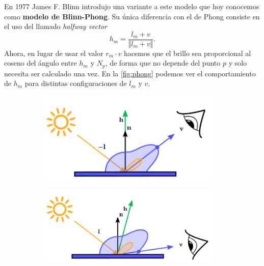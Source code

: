 En 1977 James F. Blinn \cite{blinn1977models} introdujo una variante a este modelo que hoy conocemos como \textbf{modelo de Blinn-Phong}. Su única diferencia con el de Phong consiste en el uso del llamado \textit{halfway vector}
\begin{equation*}
    h_m = \frac{l_m + v}{\Vert l_m + v\Vert}.
\end{equation*}
Ahora, en lugar de usar el valor $r_m\cdot v$ hacemos que el brillo sea proporcional al coseno del ángulo entre $h_m$ y $N_p$, de forma que no depende del punto $p$ y solo necesita ser calculado una vez. En la \autoref{fig:phong} podemos ver el comportamiento de $h_m$ para distintas configuraciones de $l_m$ y $v$.\newline
\begin{figure}[!h]
     \begin{subfigure}[b]{0.32\linewidth}
        \centering
        \includegraphics[width=0.95\textwidth, align=b]{Plantilla-TFG-master/img/phong1.png}
     \end{subfigure}
     \begin{subfigure}[b]{0.32\linewidth}
        \centering
        \includegraphics[width=0.95\textwidth, align=b]{Plantilla-TFG-master/img/phong2.png}
     \end{subfigure}
     \begin{subfigure}[b]{0.32\linewidth}
        \centering

\end{subfigure}
\end{figure}
